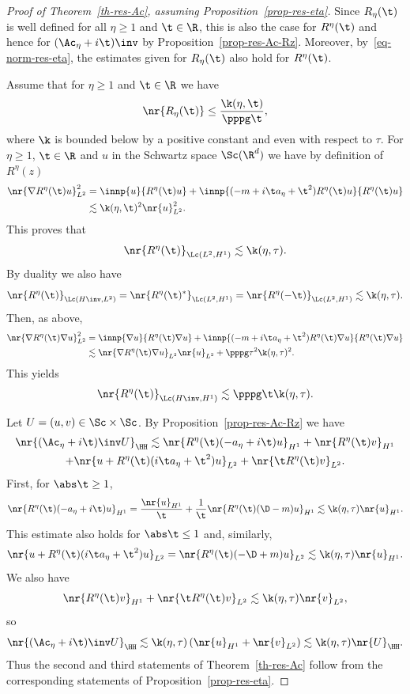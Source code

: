 \begin{proof}[Proof of Theorem~\ref{th-res-Ac}, assuming Proposition~\ref{prop-res-eta}]
Since $R_\eta(\t)$ is well defined for all $\eta \geq 1$ and $\t \in \R$, this is also the case for $R^\eta(\t)$ and hence for $(\Ac_\eta +i\t)\inv$ by Proposition~\ref{prop-res-Ac-Rz}. Moreover, by~\eqref{eq-norm-res-eta}, the estimates given for $R_\eta(\t)$ also hold for $R^\eta(\t)$.

Assume that for $\eta \geq 1$ and $\t \in \R$ we have
\[
\nr{R_\eta(\t)} \leq \frac {\k(\eta,\t)}{\pppg \t},
\]
where $\k$ is bounded below by a positive constant and even with respect to $\tau$. For $\eta \geq 1$, $\t \in \R$ and $u$ in the Schwartz space $\Sc(\R^d)$ we have by definition of $R^\eta(z)$
\begin{align*}
\nr{\nabla R^\eta(\t) u}_{L^2}^2 & = \innp{u}{R^\eta(\t) u} + \innp{(-m + i\t a_\eta + \t^2) R^{\eta}(\t)u}{R^\eta(\t) u}\\
& \lesssim \k(\eta,\t)^2 \nr{u}_{L^2}^2.
\end{align*}
This proves that
\[
\nr{R^\eta(\t)}_{\Lc(L^2,H^1)} \lesssim \k(\eta,\tau).
\]
By duality we also have
\[
\nr{R^\eta(\t)}_{\Lc(H\inv,L^2)} = \nr{R^\eta(\t)^*}_{\Lc(L^2,H^1)} = \nr{R^\eta(-\t)}_{\Lc(L^2,H^1)} \lesssim \k(\eta,\tau).
\]
Then, as above,
\begin{align*}
\nr{\nabla R^\eta(\t) \nabla u}_{L^2}^2 & = \innp{\nabla u}{R^\eta(\t) \nabla u} + \innp{(-m + i\t a_\eta + \t^2) R^{\eta}(\t) \nabla u}{R^\eta(\t) \nabla u}\\
& \lesssim \nr{\nabla R^\eta(\t) \nabla u}_{L^2} \nr{u}_{L^2} + \pppg \tau^2 \k(\eta,\tau)^2.
\end{align*}
This yields
\[
\nr{R^\eta(\t)}_{\Lc(H\inv,H^1)} \lesssim \pppg \t \k(\eta,\tau).
\]

Let $U = (u,v) \in \Sc \times \Sc$. By Proposition~\ref{prop-res-Ac-Rz} we have
\begin{multline*}
\nr{(\Ac_\eta + i\t)\inv U}_{\HH} \lesssim \nr{R^\eta(\t) (-a_\eta+i\t)u}_{H^1} + \nr{R^\eta(\t)v}_{H^1}\\
+ \nr{u + R^\eta(\t)(i\t a_\eta + \t^2)u}_{L^2} + \nr{\t R^\eta(\t)v}_{L^2}.
\end{multline*}
First, for $\abs \t \geq 1$,
\[
\nr{R^\eta(\t) (-a_\eta+i\t)u}_{H^1} = \frac {\nr{u}_{H^1}} \t + \frac 1 \t \nr{R^\eta(\t) (\D-m) u}_{H^1} \lesssim \k(\eta,\tau) \nr{u}_{H^1}.
\]
This estimate also holds for $\abs \t \leq 1$ and, similarly,
\[
\nr{u + R^\eta(\t)(i\t a_\eta + \t^2)u}_{L^2} = \nr{R^\eta(\t)(-\D+m) u}_{L^2} \lesssim \k(\eta,\tau) \nr{u}_{H^1}.
\]
We also have
\[
\nr{R^\eta(\t)v}_{H^1} + \nr{\t R^\eta(\t)v}_{L^2} \lesssim \k(\eta,\tau) \nr{v}_{L^2},
\]
so
\[
\nr{(\Ac_\eta + i\t)\inv U}_{\HH} \lesssim \k(\eta,\tau) \left(\nr{u}_{H^1} + \nr{v}_{L^2} \right) \lesssim \k(\eta,\tau) \nr{U}_\HH.
\]
Thus the second and third statements of Theorem~\ref{th-res-Ac} follow from the corresponding statements of Proposition~\ref{prop-res-eta}.
\end{proof}


